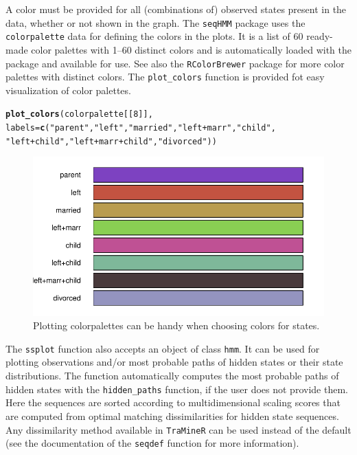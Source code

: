 \documentclass[12pt]{article}\usepackage[]{graphicx}\usepackage[]{color}
\makeatletter
\def\maxwidth{ %
  \ifdim\Gin@nat@width>\linewidth
    \linewidth
  \else
    \Gin@nat@width
  \fi
}
\newcommand{\hlnum}[1]{\textcolor[rgb]{0.686,0.059,0.569}{#1}}%
\newcommand{\hlstr}[1]{\textcolor[rgb]{0.192,0.494,0.8}{#1}}%
\newcommand{\hlstd}[1]{\textcolor[rgb]{0.345,0.345,0.345}{#1}}%
\newcommand{\hlkwc}[1]{\textcolor[rgb]{0.333,0.667,0.333}{#1}}%
\newcommand{\hlkwd}[1]{\textcolor[rgb]{0.737,0.353,0.396}{\textbf{#1}}}%
\newenvironment{kframe}{%
 \def\at@end@of@kframe{}%
 \ifinner\ifhmode%
  \def\at@end@of@kframe{\end{minipage}}%
  \begin{minipage}{\columnwidth}%
 \fi\fi%
 \def\FrameCommand##1{\hskip\@totalleftmargin \hskip-\fboxsep
 \colorbox{shadecolor}{##1}\hskip-\fboxsep
     \hskip-\linewidth \hskip-\@totalleftmargin \hskip\columnwidth}%
 \MakeFramed {\advance\hsize-\width
   \@totalleftmargin\z@ \linewidth\hsize
   \@setminipage}}%
 {\par\unskip\endMakeFramed%
 \at@end@of@kframe}
\newenvironment{knitrout}{}{} %
\makeatother
\begin{document}
A color must be provided for all (combinations of) observed states present in the data, whether or not shown in the graph. The \texttt{seqHMM} package uses the \texttt{colorpalette} data for defining the colors in the plots. It is a list of 60 ready-made color palettes with 1--60 distinct colors and is automatically loaded with the package and available for use. See also the \texttt{RColorBrewer} package for more color palettes with distinct colors. The \texttt{plot\_colors} function is provided fot easy visualization of color palettes.

\begin{knitrout}
\color{fgcolor}\begin{kframe}
\begin{alltt}
\hlkwd{plot_colors}\hlstd{(colorpalette[[}\hlnum{8}\hlstd{]],}
  \hlkwc{labels} \hlstd{=} \hlkwd{c}\hlstd{(}\hlstr{"parent"}\hlstd{,} \hlstr{"left"}\hlstd{,} \hlstr{"married"}\hlstd{,} \hlstr{"left+marr"}\hlstd{,} \hlstr{"child"}\hlstd{,}
             \hlstr{"left+child"}\hlstd{,} \hlstr{"left+marr+child"}\hlstd{,} \hlstr{"divorced"}\hlstd{))}
\end{alltt}
\end{kframe}\begin{figure}
\includegraphics[width=\maxwidth]{figure/plotColors-1} \caption[Plotting colorpalettes can be handy when choosing colors for states]{Plotting colorpalettes can be handy when choosing colors for states.}\label{fig:plotColors}
\end{figure}


\end{knitrout}

The \texttt{ssplot} function also accepts an object of class \texttt{hmm}. It can be used for plotting observations and/or most probable paths of hidden states or their state distributions. The function automatically computes the most probable paths of hidden states with the \texttt{hidden\_paths} function, if the user does not provide them. Here the sequences are sorted according to multidimensional scaling scores that are computed from optimal matching dissimilarities for hidden state sequences. Any dissimilarity method available in \texttt{TraMineR} can be used instead of the default (see the documentation of the \texttt{seqdef} function for more information).
\end{document}
